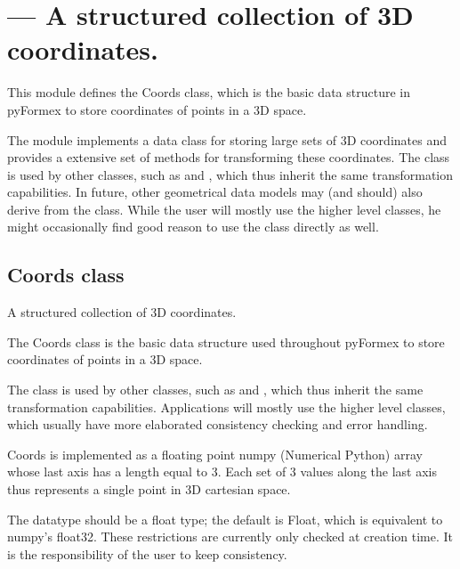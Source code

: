 
\section{ --- A structured collection of 3D coordinates.}
\label{sec:coords}


This module defines the Coords class, which is the basic data structure
in pyFormex to store coordinates of points in a 3D space.

The  module implements a data class for storing large sets of 3D coordinates and provides a extensive set of methods for transforming these coordinates. The  class is used by other classes, such as  and , which thus inherit the same transformation capabilities. In future, other geometrical data models may (and should) also derive from the  class. While the user will mostly use the higher level classes, he might occasionally find good reason to use the  class directly as well.



\subsection{Coords class}

A structured collection of 3D coordinates.
    
    The Coords class is the basic data structure used throughout pyFormex
    to store coordinates of points in a 3D space.

    The  class is used by other classes, such as 
    and , which thus inherit the same transformation
    capabilities. Applications will mostly use the higher level
    classes, which usually have more elaborated consistency checking
    and error handling.
    
    Coords is implemented as a floating point numpy (Numerical Python) array
    whose last axis has a length equal to 3.
    Each set of 3 values along the last axis thus represents a single point
    in 3D cartesian space.

    The datatype should be a float type; the default is Float, which is
    equivalent to numpy's float32.
    These restrictions are currently only checked at creation time.
    It is the responsibility of the user to keep consistency. 
    

